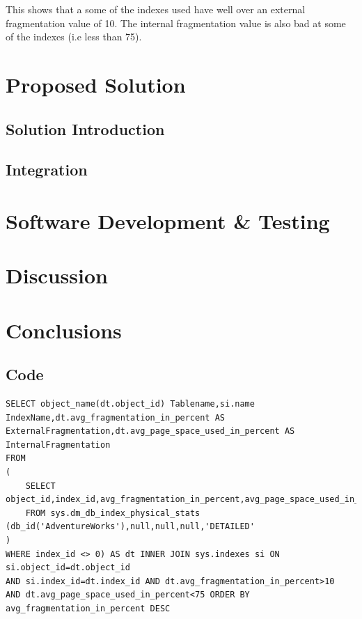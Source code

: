 \documentclass{cslthse-msc}
\begin{document}
This shows that a some of the indexes used have well over an external fragmentation value of 10. The internal fragmentation value is also bad at some of the indexes (i.e less than 75).

\chapter{Proposed Solution}\label{sec:proposedsoluton}

\section{Solution Introduction}

\section{Integration}

\chapter{Software Development \& Testing}

\chapter{Discussion}

\chapter{Conclusions}




\begin{appendices}

\chapter{Code}
\begin{lstlisting}[caption={Algorithm to find fragmented tables and the fragmentation values.},label=See DB-Fragmentation]
SELECT object_name(dt.object_id) Tablename,si.name
IndexName,dt.avg_fragmentation_in_percent AS
ExternalFragmentation,dt.avg_page_space_used_in_percent AS
InternalFragmentation
FROM
(
    SELECT object_id,index_id,avg_fragmentation_in_percent,avg_page_space_used_in_percent
    FROM sys.dm_db_index_physical_stats (db_id('AdventureWorks'),null,null,null,'DETAILED'
)
WHERE index_id <> 0) AS dt INNER JOIN sys.indexes si ON si.object_id=dt.object_id
AND si.index_id=dt.index_id AND dt.avg_fragmentation_in_percent>10
AND dt.avg_page_space_used_in_percent<75 ORDER BY avg_fragmentation_in_percent DESC
\end{lstlisting}
\label{lst:fragalg}
\end{appendices}
\end{document}
